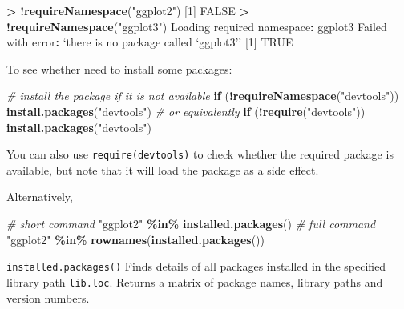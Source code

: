 \documentclass[
]{book}
\newenvironment{Shaded}{\begin{snugshade}}{\end{snugshade}}
\newcommand{\CommentTok}[1]{\textcolor[rgb]{0.56,0.35,0.01}{\textit{#1}}}
\newcommand{\ConstantTok}[1]{\textcolor[rgb]{0.56,0.35,0.01}{#1}}
\newcommand{\ControlFlowTok}[1]{\textcolor[rgb]{0.13,0.29,0.53}{\textbf{#1}}}
\newcommand{\DecValTok}[1]{\textcolor[rgb]{0.00,0.00,0.81}{#1}}
\newcommand{\FunctionTok}[1]{\textcolor[rgb]{0.13,0.29,0.53}{\textbf{#1}}}
\newcommand{\NormalTok}[1]{#1}
\newcommand{\SpecialCharTok}[1]{\textcolor[rgb]{0.81,0.36,0.00}{\textbf{#1}}}
\newcommand{\StringTok}[1]{\textcolor[rgb]{0.31,0.60,0.02}{#1}}
\theoremstyle{definition}
\theoremstyle{definition}
\theoremstyle{definition}
\theoremstyle{definition}
\theoremstyle{remark}
\begin{document}
\begin{Shaded}
\begin{Highlighting}[]
\SpecialCharTok{\textgreater{}} \SpecialCharTok{!}\FunctionTok{requireNamespace}\NormalTok{(}\StringTok{"ggplot2"}\NormalTok{)}
\NormalTok{[}\DecValTok{1}\NormalTok{] }\ConstantTok{FALSE}
\SpecialCharTok{\textgreater{}} \SpecialCharTok{!}\FunctionTok{requireNamespace}\NormalTok{(}\StringTok{"ggplot3"}\NormalTok{)}
\NormalTok{Loading required namespace}\SpecialCharTok{:}\NormalTok{ ggplot3}
\NormalTok{Failed with error}\SpecialCharTok{:}\NormalTok{  ‘there is no package called ‘ggplot3’’}
\NormalTok{[}\DecValTok{1}\NormalTok{] }\ConstantTok{TRUE}
\end{Highlighting}
\end{Shaded}

To see whether need to install some packages:

\begin{Shaded}
\begin{Highlighting}[]
\CommentTok{\# install the package if it is not available}
\ControlFlowTok{if}\NormalTok{ (}\SpecialCharTok{!}\FunctionTok{requireNamespace}\NormalTok{(}\StringTok{"devtools"}\NormalTok{)) }\FunctionTok{install.packages}\NormalTok{(}\StringTok{"devtools"}\NormalTok{)}
\CommentTok{\# or equivalently}
\ControlFlowTok{if}\NormalTok{ (}\SpecialCharTok{!}\FunctionTok{require}\NormalTok{(}\StringTok{"devtools"}\NormalTok{)) }\FunctionTok{install.packages}\NormalTok{(}\StringTok{"devtools"}\NormalTok{)}
\end{Highlighting}
\end{Shaded}

You can also use \texttt{require(devtools)} to check whether the required package is available, but note that it will load the package as a side effect.

Alternatively,

\begin{Shaded}
\begin{Highlighting}[]
\CommentTok{\# short command}
\StringTok{"ggplot2"} \SpecialCharTok{\%in\%} \FunctionTok{installed.packages}\NormalTok{()}
\CommentTok{\# full command}
\StringTok{"ggplot2"} \SpecialCharTok{\%in\%} \FunctionTok{rownames}\NormalTok{(}\FunctionTok{installed.packages}\NormalTok{())}
\end{Highlighting}
\end{Shaded}

\texttt{installed.packages()} Finds details of all packages installed in the specified library path \texttt{lib.loc}. Returns a matrix of package names, library paths and version numbers.
\end{document}
